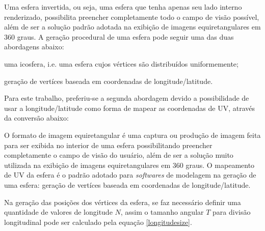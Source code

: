 \documentclass[conference]{IEEEtran}
\begin{document}
Uma esfera invertida, ou seja, uma esfera que tenha apenas seu lado interno renderizado, possibilita preencher completamente todo o campo de visão possível, além de ser a solução padrão adotada na exibição de imagens equiretangulares em 360 graus. A geração procedural de uma esfera pode seguir uma das duas abordagens abaixo:
\begin{enumerate}
  \begin{item} uma icosfera, i.e. uma esfera cujos vértices são distribuídos uniformemente; \end{item}
  \begin{item} geração de vertíces baseada em coordenadas de longitude/latitude. \end{item}
\end{enumerate}

Para este trabalho, preferiu-se a segunda abordagem devido a possibilidade de usar a longitude/latitude como forma de mapear as coordenadas de UV, através da conversão abaixo:

O formato de imagem equiretangular é uma captura ou produção de imagem feita para ser exibida no interior de uma esfera possibilitando preencher completamente o campo de visão do usuário, além de ser a solução muito utilizada na exibição de imagens equiretangulares em 360 graus. O mapeamento de UV da esfera é o padrão adotado para \textit{softwares} de modelagem na geração de uma esfera: geração de vertíces baseada em coordenadas de longitude/latitude.


Na geração das posições dos vértices da esfera, se faz necessário definir uma quantidade de valores de longitude $N$, assim o tamanho angular $T$ para divisão longitudinal pode ser calculado pela equação \ref{longitudesize}.
\end{document}
